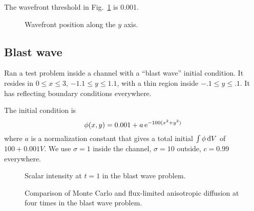 The wavefront threshold in Fig.~\ref{fig:tdReactorWavefront} is 0.001.

\begin{figure}[htb]
  \centering\small
  \subfloat[Channel, $y=2.5$]{%
    }

  \subfloat[Medium, $y=0$]{%
    }

  \caption{Wavefront position along the $y$ axis.}
  \label{fig:tdReactorWavefront}
\end{figure}

\clearpage
\subsection{Blast wave}

Ran a test problem inside a channel with a ``blast wave'' initial condition. It
resides in $0 \le x \le 3$, $-1.1 \le y \le 1.1$, with a thin region inside
$-.1 \le y \le .1$. It has reflecting boundary conditions everywhere.

The initial condition is
\begin{equation*}
  \phi(x,y) = 0.001 + a \mathop{}\!\mathrm{e}^{-100 (x^2 + y^2) }
\end{equation*}
where $a$ is a normalization constant that gives a total initial $\int \phi
\mathop{}\!\mathrm{d} V$ of $100 + 0.001 V$. We use $\sigma=1$ inside the channel, $\sigma=10$
outside, $c=0.99$ everywhere.

\begin{figure}[htb]
  \centering\small

  \caption{Scalar intensity at $t=1$ in the blast wave problem.}
  \label{fig:tdBlastwave}
\end{figure}

\begin{figure}[htb]
  \centering\small
    

  \caption{Comparison of Monte Carlo and flux-limited anisotropic diffusion at
  four times in the blast wave problem.}
  \label{fig:tdBlastwaveAll}
\end{figure}


